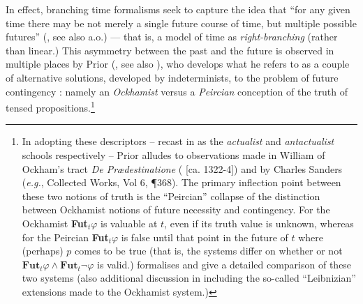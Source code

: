 \documentclass[12pt,dvipsnames]{report}
\begin{document}
 In effect, branching time formalisms seek to capture the idea that ``for any given time there may be not merely a single future course of time, but multiple possible futures'' (\citealp[63]{Dowty1977}, see also \citealp{Thomason1970,Burgess1978} a.o.) --- that is, a model of time as \textit{right-branching} (rather than linear.) This asymmetry between the past and the future is observed in multiple places by Prior (\citeyear{Prior1957,Prior1967}, see also \citealt{Copeland2020}), who develops what he refers to as a couple of alternative solutions, developed by indeterminists, to the problem of future contingency \citeyearpar[\textit{e.g.},][121\textit{ff}]{Prior1967}: namely an \textit{Ockhamist} versus a \textit{Peircian} conception of the truth of tensed propositions.\footnote{In adopting these descriptors -- recast in \citealt{Burgess1978} as the \textit{actualist} and \textit{antactualist} schools respectively -- Prior alludes to observations made in William of Ockham's tract \textit{De Prædestinatione} (\citeyear{praedestinatione} [ca. 1322-4]) and by Charles Sanders \citeauthor{Peirce} (\textit{e.g.}, Collected Works, Vol 6, ¶368). The primary inflection point between these two notions of truth is the ``Peircian'' collapse of the distinction between Ockhamist notions of future necessity and contingency. For the Ockhamist \textbf{Fut}$ _t\varphi$ is valuable at $ t $, even if its truth value is unknown, whereas for the Peircian \textbf{Fut}$_t\varphi $ is false until that point in the future of $ t $ where (perhaps) $ p $ comes to be true (that is, the systems differ on whether or not $ \textbf{Fut}_t\varphi\wedge\textbf{Fut}_t\neg\varphi $ is valid.) \citet[126\textit{ff}]{Prior1967} formalises and give a detailed comparison of these two systems (also additional discussion in \citealp{Øhrstrøm1995,Øhrstrøm2020,Nishimura1979} including the so-called ``Leibnizian'' extensions made to the Ockhamist system.)}
\end{document}
